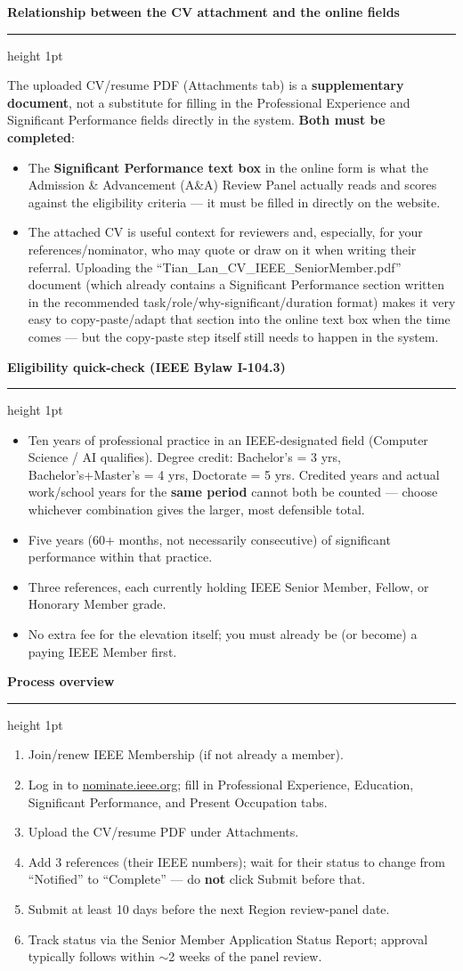 \documentclass[10.5pt]{article}
\newcommand{\cvsection}[1]{%
  \vspace{10pt}
  {\color{accent}\Large\bfseries #1}\par
  \vspace{2pt}
  {\color{accent}\hrule height 1pt}
  \vspace{6pt}
}
\begin{document}
\cvsection{Relationship between the CV attachment and the online fields}
The uploaded CV/resume PDF (Attachments tab) is a \textbf{supplementary document}, not a substitute for filling in the Professional Experience and Significant Performance fields directly in the system. \textbf{Both must be completed}:
\begin{itemize}
  \item The \textbf{Significant Performance text box} in the online form is what the Admission \& Advancement (A\&A) Review Panel actually reads and scores against the eligibility criteria --- it must be filled in directly on the website.
  \item The attached CV is useful context for reviewers and, especially, for your references/nominator, who may quote or draw on it when writing their referral. Uploading the ``Tian\_Lan\_CV\_IEEE\_SeniorMember.pdf'' document (which already contains a Significant Performance section written in the recommended task/role/why-significant/duration format) makes it very easy to copy-paste/adapt that section into the online text box when the time comes --- but the copy-paste step itself still needs to happen in the system.
\end{itemize}

\cvsection{Eligibility quick-check (IEEE Bylaw I-104.3)}
\begin{itemize}
  \item Ten years of professional practice in an IEEE-designated field (Computer Science / AI qualifies). Degree credit: Bachelor's = 3 yrs, Bachelor's+Master's = 4 yrs, Doctorate = 5 yrs. Credited years and actual work/school years for the \textbf{same period} cannot both be counted --- choose whichever combination gives the larger, most defensible total.
  \item Five years (60+ months, not necessarily consecutive) of significant performance within that practice.
  \item Three references, each currently holding IEEE Senior Member, Fellow, or Honorary Member grade.
  \item No extra fee for the elevation itself; you must already be (or become) a paying IEEE Member first.
\end{itemize}

\cvsection{Process overview}
\begin{enumerate}
  \item Join/renew IEEE Membership (if not already a member).
  \item Log in to \href{https://nominate.ieee.org}{nominate.ieee.org}; fill in Professional Experience, Education, Significant Performance, and Present Occupation tabs.
  \item Upload the CV/resume PDF under Attachments.
  \item Add 3 references (their IEEE numbers); wait for their status to change from ``Notified'' to ``Complete'' --- do \textbf{not} click Submit before that.
  \item Submit at least 10 days before the next Region review-panel date.
  \item Track status via the Senior Member Application Status Report; approval typically follows within $\sim$2 weeks of the panel review.
\end{enumerate}
\end{document}
